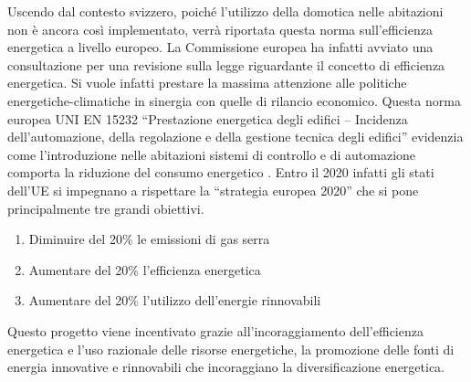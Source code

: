 Uscendo dal contesto svizzero, poiché l’utilizzo della domotica nelle abitazioni non è ancora così implementato, verrà riportata questa norma sull’efficienza energetica a livello europeo. La Commissione europea ha infatti avviato una consultazione per una revisione sulla legge riguardante il concetto di efficienza energetica. Si vuole infatti prestare la massima attenzione alle politiche energetiche-climatiche in sinergia con quelle di rilancio economico. Questa norma europea UNI EN 15232 “Prestazione energetica degli edifici – Incidenza dell’automazione, della regolazione e della gestione tecnica degli edifici” evidenzia come l’introduzione nelle abitazioni sistemi di controllo e di automazione comporta la riduzione del consumo energetico .
Entro il 2020 infatti gli stati dell’UE si impegnano a rispettare la “strategia europea 2020” che si pone principalmente tre grandi obiettivi.
\begin{enumerate}
\item  Diminuire del 20\% le emissioni di gas serra

\item  Aumentare del 20\% l'efficienza energetica

\item  Aumentare del 20\% l'utilizzo dell'energie rinnovabili
\end{enumerate}
Questo progetto viene incentivato grazie all’incoraggiamento dell’efficienza energetica e l’uso razionale delle risorse energetiche, la promozione delle fonti di energia innovative e rinnovabili che incoraggiano la diversificazione energetica.
